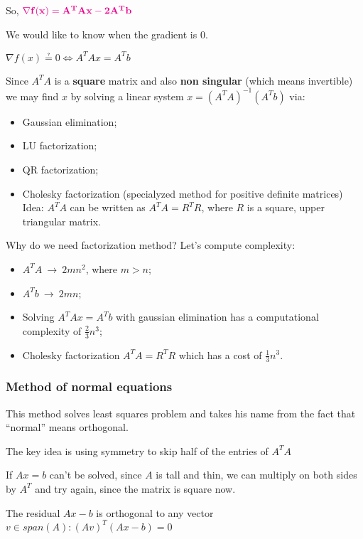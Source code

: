 \documentclass[ComputationalMathematics.tex]{subfiles}
\begin{document}
So, ${\bf \color{magenta} \nabla  f(x) = {A}^{T}Ax - 2{A}^{T}b}$

We would like to know when the gradient is $0$.

$\nabla  f(x) \questeq 0 \Leftrightarrow {A}^{T}Ax = {A}^{T}b$

Since ${A}^{T}A$ is a {\bf square} matrix and also {\bf non singular} (which means invertible) we may find $x$ by solving a linear system $x={({A}^{T}A)}^{-1}({A}^{T}b)$ via:

\begin{itemize}
  \item Gaussian elimination;
  \item LU factorization;
  \item QR factorization;
  \item Cholesky factorization (specialyzed method for positive definite matrices)
    Idea: ${A}^{T}A$ can be written as ${A}^{T}A={R}^{T}R$, where $R$ is a square, upper triangular matrix.
\end{itemize}

Why do we need factorization method?
Let's compute complexity:
\begin{itemize}
  \item ${A}^{T}A ~ \rightarrow ~ 2m{n}^{2}$, where $m>n$;
  \item ${A}^{T}b ~ \rightarrow ~ 2mn$;
  \item Solving ${A}^{T}Ax={A}^{T}b$ with gaussian elimination has a computational complexity of $\frac{2}{3}{n}^{3}$;
  \item Cholesky factorization ${A}^{T}A={R}^{T}R$ which has a cost of $\frac{1}{3}{n}^{3}$.


\end{itemize}

\subsubsection{Method of normal equations}
This method solves least squares problem and takes his name from the fact that ``normal'' means orthogonal.

The key idea is using symmetry to skip half of the entries of ${A}^{T}A$

If $Ax=b$ can't be solved, since $A$ is tall and thin, we can multiply on both sides by ${A}^{T}$ and try again, since the matrix is square now.

The residual $Ax-b$ is orthogonal to any vector $v \in span(A): {(Av)}^{T} (Ax-b)=0$
\end{document}
